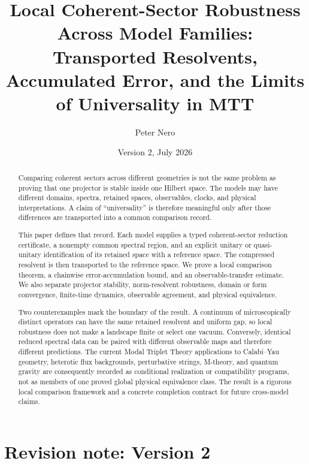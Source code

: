 \documentclass[11pt]{article}
\title{\vspace{-1em}
Local Coherent-Sector Robustness Across Model Families:\\[0.25em]
\large Transported Resolvents, Accumulated Error, and the Limits of Universality in MTT}
\author{Peter Nero}
\date{Version 2, July 2026}
\theoremstyle{definition}
\theoremstyle{remark}
\newcommand{\1}{\mathbf 1}
\begin{document}
\maketitle

\begin{abstract}
Comparing coherent sectors across different geometries is not the same
problem as proving that one projector is stable inside one Hilbert space.
The models may have different domains, spectra, retained spaces,
observables, clocks, and physical interpretations.  A claim of
``universality'' is therefore meaningful only after those differences are
transported into a common comparison record.

This paper defines that record.  Each model supplies a typed
coherent-sector reduction certificate, a nonempty common spectral region,
and an explicit unitary or quasi-unitary identification of its retained
space with a reference space.  The compressed resolvent is then transported
to the reference space.  We prove a local comparison theorem, a chainwise
error-accumulation bound, and an observable-transfer estimate.  We also
separate projector stability, norm-resolvent robustness, domain or form
convergence, finite-time dynamics, observable agreement, and physical
equivalence.

Two counterexamples mark the boundary of the result.  A continuum of
microscopically distinct operators can have the same retained resolvent and
uniform gap, so local robustness does not make a landscape finite or select
one vacuum.  Conversely, identical reduced spectral data can be paired with
different observable maps and therefore different predictions.  The
current Modal Triplet Theory applications to Calabi--Yau geometry,
heterotic flux backgrounds, perturbative strings, M-theory, and quantum
gravity are consequently recorded as conditional realization or
compatibility programs, not as members of one proved global physical
equivalence class.  The result is a rigorous local comparison framework and
a concrete completion contract for future cross-model claims.
\end{abstract}

\section*{Revision note: Version 2}
\end{document}
